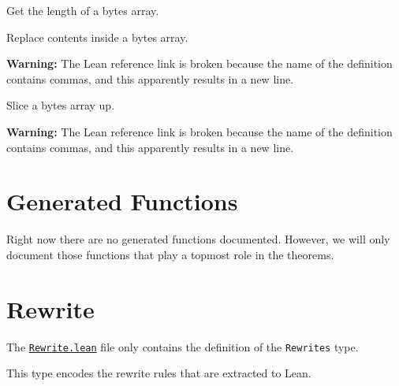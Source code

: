 \begin{definition}[lengthBytes]\label{def:lengthBytes}
\leanok{}
Get the length of a bytes array.
\end{definition}

\begin{definition}[replaceAtBytes]\label{def:replaceAtBytes}
\leanok{}
Replace contents inside a bytes array.

\textbf{Warning:} The Lean reference link is broken because the name of the
definition contains commas, and this apparently results in a new line.
\end{definition}

\begin{definition}[substrBytes]\label{def:substrBytes}
\leanok{}
Slice a bytes array up.

\textbf{Warning:} The Lean reference link is broken because the name of the
definition contains commas, and this apparently results in a new line.
\end{definition}

\section{Generated Functions}

Right now there are no generated functions documented. However, we will only document those functions that play a topmost role in the theorems.

\section{Rewrite}
The
\href{https://github.com/runtimeverification/evm-equivalence/blob/master/EvmEquivalence/KEVM2Lean/Rewrite.lean}{\texttt{Rewrite.lean}}
file only contains the definition of the \texttt{Rewrites} type.

This type encodes the rewrite rules that are extracted to Lean.

